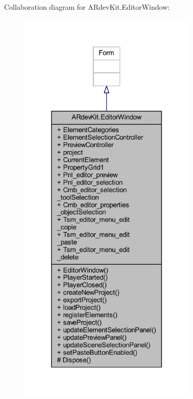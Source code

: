 Collaboration diagram for A\-Rdev\-Kit.\-Editor\-Window\-:
\nopagebreak
\begin{figure}[H]
\begin{center}
\leavevmode
\includegraphics[height=550pt]{class_a_rdev_kit_1_1_editor_window__coll__graph}
\end{center}
\end{figure}
